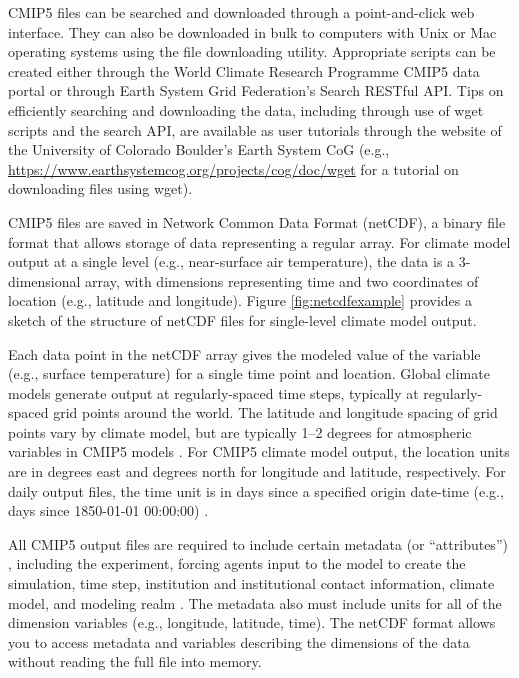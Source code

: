 CMIP5 files can be searched and downloaded through a point-and-click web
interface. They can also be downloaded in bulk to computers with Unix or
Mac operating systems using the  file downloading utility.
Appropriate  scripts can be created either through the World
Climate Research Programme CMIP5 data portal or through Earth System
Grid Federation's Search RESTful API. Tips on efficiently searching and
downloading the data, including through use of wget scripts and the
search API, are available as user tutorials through the website of the
University of Colorado Boulder's Earth System CoG (e.g.,
\url{https://www.earthsystemcog.org/projects/cog/doc/wget} for a
tutorial on downloading files using wget).

CMIP5 files are saved in Network Common Data Format (netCDF), a binary
file format that allows storage of data representing a regular array.
For climate model output at a single level (e.g., near-surface air
temperature), the data is a 3-dimensional array, with dimensions
representing time and two coordinates of location (e.g., latitude and
longitude). Figure \ref{fig:netcdfexample} provides a sketch of the
structure of netCDF files for single-level climate model output.

Each data point in the netCDF array gives the modeled value of the
variable (e.g., surface temperature) for a single time point and
location. Global climate models generate output at regularly-spaced time
steps, typically at regularly-spaced grid points around the world. The
latitude and longitude spacing of grid points vary by climate model, but
are typically 1--2 degrees for atmospheric variables in CMIP5 models
\citep{IPCCch9}. For CMIP5 climate model output, the location units are
in degrees east and degrees north for longitude and latitude,
respectively. For daily output files, the time unit is in days since a
specified origin date-time (e.g., days since 1850-01-01 00:00:00)
\citep{taylor2010cmip5}.

All CMIP5 output files are required to include certain metadata (or
``attributes'') \citep{taylor2010cmip5}, including the experiment,
forcing agents input to the model to create the simulation, time step,
institution and institutional contact information, climate model, and
modeling realm \citep{taylor2010cmip5}. The metadata also must include
units for all of the dimension variables (e.g., longitude, latitude,
time). The netCDF format allows you to access metadata and variables
describing the dimensions of the data without reading the full file into
memory.

